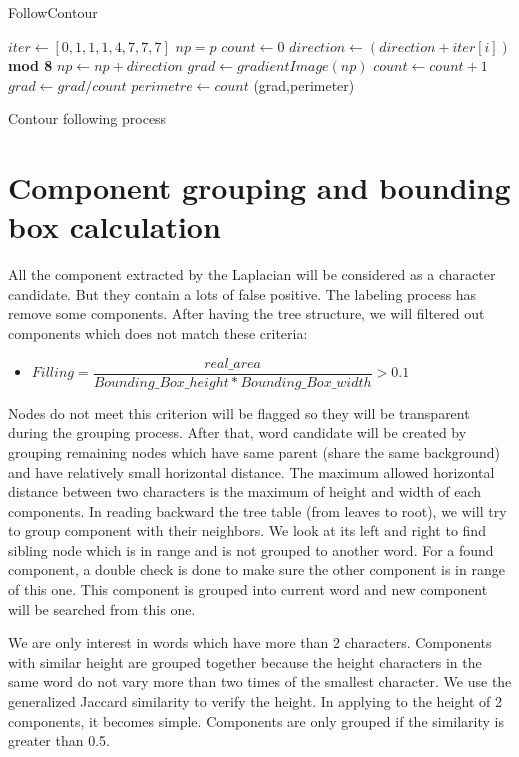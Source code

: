 \begin{algorithm}
\caption{FollowContour}\label{alg:ContourFollowing}
\begin{algorithmic}[1]
\State $iter \gets [0,1,1,1,4,7,7,7]$
\State $np = p$ 
\State $count \gets 0$
\Repeat 
{}
	\State $direction \gets (direction + iter[i])$ \textbf{ mod 8}
		\State $np \gets np+direction$
		\State $grad \gets gradientImage(np)$
		\State $count \gets count+1$
	\EndIf
\EndFor
{}
\State $grad\gets grad/count$
\State $perimetre \gets count $
\State \Return (grad,perimeter)
\EndProcedure
\end{algorithmic}
\caption{Contour following process}
\end{algorithm}

\section{Component grouping and bounding box calculation} \label{Grouping}
\par
All the component extracted by the Laplacian will be considered as a character candidate. But they contain a lots of false positive. The labeling process has remove some components. After having the tree structure, we will filtered out components which does not match these criteria:
\begin{itemize} 
	\item $Filling =\dfrac{real\_area}{Bounding\_Box\_height*Bounding\_Box\_width} >0.1$
\end{itemize}
\par
Nodes do not meet this criterion will be flagged so they will be transparent during the grouping process. After that, word candidate will be created by grouping remaining nodes which have same parent (share the same background) and have relatively small horizontal distance. The maximum allowed horizontal distance between two characters is the maximum of height and width of each components. In reading backward the tree table (from leaves to root), we will try to group component with their neighbors. We look at its left and right to find sibling node which is in range and is not grouped to another word. For a found component, a double check is done to make sure the other component is in range of this one. This component is grouped into current word and new component will be searched from this one. 
\par
We are only interest in words which have more than 2 characters. Components with similar height are grouped together because the height characters in the same word do not vary more than two times of the smallest character. We use the generalized Jaccard similarity to verify the height. In applying to the height of 2 components, it becomes simple. Components are only grouped if the similarity is greater than 0.5.

